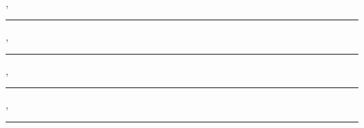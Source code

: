 
\ifnum{}
\newpage
\thispagestyle{empty}
\begin{center}
    \large
    \textbf{\country\\ \university \\ \MakeUppercase\faculty}
    \vspace*{0.5cm}
    
    \textbf{\titleOfThesis}
\end{center}

\signText


\vspace*{0.5cm}

\begin{minipage}{0.45\textwidth}
\centering
\singlespacing
{ \advisor\\ \advisorUni \\ \advisorT }
\end{minipage}
\ifnum{}
\hfill
\begin{minipage}{0.45\textwidth}
\centering
\singlespacing
{ \coadvisor\\ \coadvisorUni \\ \coadvisorT }
\end{minipage}
\fi

\vspace*{1cm}

{{\bfseries \signmember}}

\ifnum{}
{ \advisor, \advisorT \\ \advisorUni \hfill\rule{5cm}{1pt} }

{ \memberi, \memberT \\ \memberiUni \hfill\rule{5cm}{1pt} }

{ \memberii, \memberT \\ \memberiiUni \hfill\rule{5cm}{1pt} }

{ \memberiii, \memberT \\ \memberiiiUni \hfill\rule{5cm}{1pt} }

